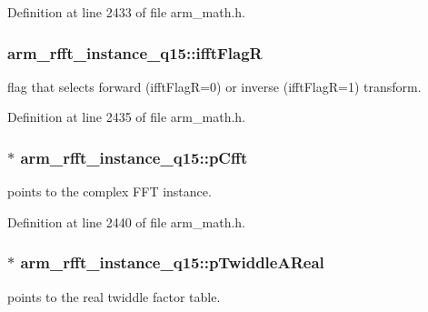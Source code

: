 Definition at line 2433 of file arm\-\_\-math.\-h.

\hypertarget{structarm__rfft__instance__q15_a8051ffe268c147e431e1bea7bb4c4258}{
\subsubsection[{ifft\-Flag\-R}]{ arm\-\_\-rfft\-\_\-instance\-\_\-q15\-::ifft\-Flag\-R}}\label{structarm__rfft__instance__q15_a8051ffe268c147e431e1bea7bb4c4258}
flag that selects forward (ifft\-Flag\-R=0) or inverse (ifft\-Flag\-R=1) transform. 

Definition at line 2435 of file arm\-\_\-math.\-h.

\hypertarget{structarm__rfft__instance__q15_acd8f28f777f3417280212ce799ebef46}{
\subsubsection[{p\-Cfft}]{$\ast$ arm\-\_\-rfft\-\_\-instance\-\_\-q15\-::p\-Cfft}}\label{structarm__rfft__instance__q15_acd8f28f777f3417280212ce799ebef46}
points to the complex F\-F\-T instance. 

Definition at line 2440 of file arm\-\_\-math.\-h.

\hypertarget{structarm__rfft__instance__q15_affbf2de522ac029432d98e8373c0ec53}{
\subsubsection[{p\-Twiddle\-A\-Real}]{$\ast$ arm\-\_\-rfft\-\_\-instance\-\_\-q15\-::p\-Twiddle\-A\-Real}}\label{structarm__rfft__instance__q15_affbf2de522ac029432d98e8373c0ec53}
points to the real twiddle factor table. 

